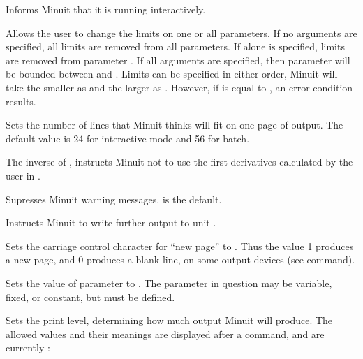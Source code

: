
Informs Minuit that it is running interactively.


Allows the user to change the limits on one or all parameters.
If no arguments are specified, all limits are removed from all parameters.
If \Lit{[parno]} alone is specified, limits are removed from parameter 
\Lit{[parno]}.
If all arguments are specified, then parameter \Lit{[parno]} will be bounded
between \Lit{[lolim]} and \Lit{[uplim]}. 
Limits can be specified in either order,
Minuit will take the smaller as \Lit{[lolim]} and the larger as \Lit{[uplim]}.
However, if \Lit{[lolim]} is equal to \Lit{[uplim]}, an error condition results.


Sets the number of lines that Minuit thinks will fit on
one page of output.
The default value is 24 for interactive mode and 56 for batch.


The inverse of , instructs Minuit not to use the
first derivatives calculated by the user in .


Supresses Minuit warning messages.  is the default.


Instructs Minuit to write further output to unit .


Sets the carriage control character for ``new page'' to .
Thus the value 1 produces a new page, and 0 produces a blank line,
on some output devices (see  command).


Sets the value of parameter  to .  
The parameter
in question may be variable, fixed, or constant, but must be defined.


Sets the print level, determining how much output
Minuit will produce.
The allowed values and their meanings are displayed
after a  command, and are currently :

